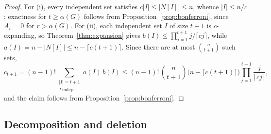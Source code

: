 \documentclass[11pt,a4paper]{article}
\numberwithin{equation}{section}
\theoremstyle{plain}
\theoremstyle{definition}
\theoremstyle{remark}
\begin{document}
\begin{proof}
For (i), every independent set satisfies \(c|I|\le|N[I]|\le n\), whence
\(|I|\le n/c\); exactness for \(t\ge\alpha(G)\) follows from
Proposition~\ref{prop:bonferroni}, since \(A_r=0\) for \(r>\alpha(G)\).
For (ii), each independent set \(I\) of size \(t+1\) is \(c\)-expanding, so
Theorem~\ref{thm:expansion} gives
\(b(I)\le\prod_{j=1}^{t+1} j/\lceil cj\rceil\), while
\(a(I)=n-|N[I]|\le n-\lceil c(t+1)\rceil\). Since there are at most
\(\binom{n}{t+1}\) such sets,
\[
c_{t+1}
=
(n-1)!\sum_{\substack{|I|=t+1\\ I\ \mathrm{indep}}}a(I)\,b(I)
\le
(n-1)!\,\binom{n}{t+1}\bigl(n-\lceil c(t+1)\rceil\bigr)
\prod_{j=1}^{t+1}\frac{j}{\lceil cj\rceil},
\]
and the claim follows from Proposition~\ref{prop:bonferroni}.
\end{proof}

\subsection{Decomposition and deletion}
\end{document}
